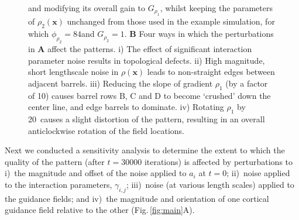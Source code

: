 \documentclass[9pt,lineno]{elife}
\newcommand{\MPthreeSens}[1]{\textcolor{colmpthreesens}{#1}}
\newcommand{\mb}[1]{\mathbf{#1}}
\begin{document}
\begin{figure}
\begin{fullwidth}
{{        and modifying its overall gain to $G_{\rho_1}$, whilst keeping the
        parameters of $\rho_2(\mb{x})$ unchanged from those used in the
        example simulation, for which $\phi_{\rho_2}=84$\textdegree and
        $G_{\rho_2}=1$.
        \textbf{B} Four ways in which the perturbations in \textbf{A} affect
        the patterns. i) The effect of significant interaction parameter noise
        results in topological defects. ii) High magnitude, short lengthscale
        noise in $\rho(\mb{x})$ leads to non-straight edges between adjacent
        barrels. iii) Reducing the slope of gradient $\rho_1$ (by a factor of
        10) causes barrel rows B, C and D to become `crushed' down the center
        line, and edge barrels to dominate. iv) Rotating $\rho_1$ by
        20\textdegree~causes a slight distortion of the pattern, resulting in
        an overall anticlockwise rotation of the field locations. }}
    \label{fig:sens}
  \end{fullwidth}
\end{figure}


\MPthreeSens{Next we conducted a sensitivity analysis to determine the extent
  to which the quality of the pattern (after $t=30000$ iterations) is affected
  by perturbations to i)~the magnitude and offset of the noise applied to
  $a_i$ at $t=0$; ii)~noise applied to the interaction parameters,
  $\gamma_{i,j}$; iii)~noise (at various length scales) applied to the
  guidance fields; and iv)~the magnitude and orientation of one cortical
  guidance field relative to the other (Fig.\,\ref{fig:main}A).}
\end{document}
